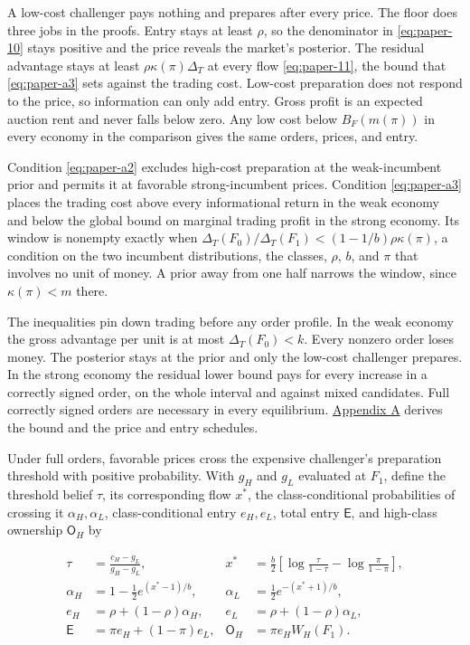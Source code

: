 A low-cost challenger pays nothing and prepares after every price.
The floor does three jobs in the proofs. Entry stays at least
\(\rho\), so the denominator in \eqref{eq:paper-10} stays positive
and the price reveals the market's posterior. The residual advantage
stays at least \(\rho\kappa(\pi)\Delta_T\) at every flow
\eqref{eq:paper-11}, the bound that \eqref{eq:paper-a3} sets against
the trading cost. Low-cost preparation does not respond to the price,
so information can only add entry. Gross profit is an expected
auction rent and never falls below zero. Any low cost below
\(B_F(m(\pi))\) in every economy in the comparison gives the same
orders, prices, and entry.

Condition \eqref{eq:paper-a2} excludes high-cost preparation at the
weak-incumbent prior and permits it at favorable strong-incumbent
prices. Condition \eqref{eq:paper-a3} places the trading cost above
every informational return in the weak economy and below the global
bound on marginal trading profit in the strong economy. Its window is
nonempty exactly when
\(\Delta_T(F_0)/\Delta_T(F_1)<(1-1/b)\rho\kappa(\pi)\), a condition on
the two incumbent distributions, the classes, \(\rho\), \(b\), and
\(\pi\) that involves no unit of money. A prior away from one half
narrows the window, since \(\kappa(\pi)<m\) there.

The inequalities pin down trading before any order profile. In the
weak economy the gross advantage per unit is at most
\(\Delta_T(F_0)<k\). Every nonzero order loses money. The posterior
stays at the prior and only the low-cost challenger prepares. In the
strong economy the residual lower bound pays for every increase in a
correctly signed order, on the whole interval and against mixed
candidates. Full correctly signed orders are necessary in every
equilibrium. \hyperref[paper-appendix]{Appendix A} derives the bound
and the price and entry schedules.

Under full orders, favorable prices cross the expensive challenger's
preparation threshold with positive probability. With \(g_H\) and
\(g_L\) evaluated at \(F_1\), define the threshold belief \(\tau\), its
corresponding flow \(x^*\), the class-conditional probabilities of
crossing it \(\alpha_H,\alpha_L\), class-conditional entry \(e_H,e_L\),
total entry \(\mathsf E\), and high-class ownership \(\mathsf O_H\) by

\[
\begin{aligned}
\tau&=\frac{c_H-g_L}{g_H-g_L},&
x^*&=\frac b2\left[\log\frac\tau{1-\tau}-\log\frac\pi{1-\pi}\right],\\
\alpha_H&=1-\frac12e^{(x^*-1)/b},&
\alpha_L&=\frac12e^{-(x^*+1)/b},\\
e_H&=\rho+(1-\rho)\alpha_H,&
e_L&=\rho+(1-\rho)\alpha_L,\\
\mathsf E&=\pi e_H+(1-\pi)e_L,&
\mathsf O_H&=\pi e_HW_H(F_1).
\end{aligned}
\tag{12}\label{eq:paper-12}
\]

